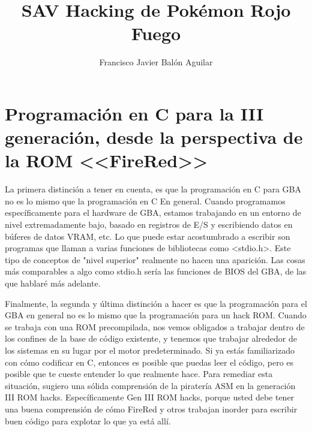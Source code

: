 \documentclass[a4paper, 11pt, titlepage]{article}
\title{SAV Hacking de Pokémon Rojo Fuego}
\author{Francisco Javier Balón Aguilar}
\begin{document}
\maketitle
\renewcommand{\contentsname}{Índice}
\tableofcontents
\newpage

\section{Programación en C para la III generación, desde la perspectiva de la ROM <<FireRed>>}

    La primera distinción a tener en cuenta, es que la programación en C para GBA no es lo 
    mismo que la programación en C En general. Cuando programamos específicamente para el 
    hardware de GBA, estamos trabajando en un entorno de nivel extremadamente bajo, basado en 
    registros de E/S y escribiendo datos en búferes de datos VRAM, etc. Lo que puede estar 
    acostumbrado a escribir son programas que llaman a varias funciones de bibliotecas como 
    <stdio.h>. Este tipo de conceptos de "nivel superior" realmente no hacen una aparición. 
    Las cosas más comparables a algo como stdio.h sería las funciones de BIOS del GBA, de 
    las que hablaré más adelante.

    Finalmente, la segunda y última distinción a hacer es que la programación para el GBA 
    en general no es lo mismo que la programación para un hack ROM. Cuando se trabaja con 
    una ROM precompilada, nos vemos obligados a trabajar dentro de los confines de la base 
    de código existente, y tenemos que trabajar alrededor de los sistemas en su lugar por 
    el motor predeterminado. Si ya estás familiarizado con cómo codificar en C, entonces es 
    posible que puedas leer el código, pero es posible que te cueste entender lo que 
    realmente hace. Para remediar esta situación, sugiero una sólida comprensión de la 
    piratería ASM en la generación III ROM hacks. Específicamente Gen III ROM hacks, porque 
    usted debe tener una buena comprensión de cómo FireRed y otros trabajan inorder para 
    escribir buen código para explotar lo que ya está allí.
\end{document}
